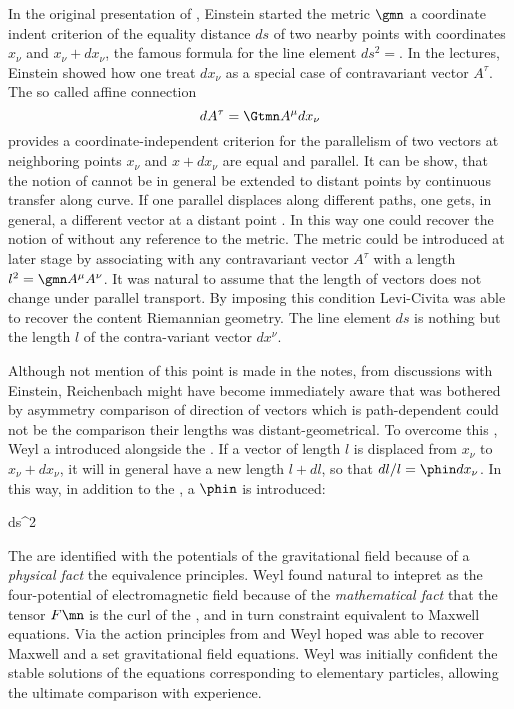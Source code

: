 {In the original presentation of \rt, Einstein started the metric $\gmn$ a coordinate indent criterion of the equality distance $ds$ of two nearby points  with coordinates $x_\nu$ and $x_\nu+dx_\nu$, the famous formula for the line element $ds^2=$. In the lectures, Einstein showed how one treat $dx_\nu$ as a special case of contravariant vector $A^\tau$. The so called affine connection $$dA^\tau = \Gtmn A^\mu dx_\nu$$ provides a coordinate-independent criterion for the parallelism of two vectors at neighboring points $x_\nu$ and $x+dx_\nu$ are equal and parallel. It can be show, that the notion of  cannot be in general be extended to distant points by continuous transfer along curve. If one parallel displaces along different paths, one gets, in general, a different vector at a distant point \citep[028-01-03, 37]{HR}. In this way one could recover the notion of  without any reference to the metric. The metric could be introduced at later stage by associating with any contravariant vector $A^\tau$ with a length $l^2=\gmn A^\mu A^\nu$. It was natural to assume that the length of vectors does not change under parallel transport. By imposing this condition Levi-Civita was able to recover the content Riemannian geometry. The line element $ds$ is nothing but the length $l$ of the contra-variant vector $dx^\nu$. 

Although not mention of this point is made in the notes, from discussions with Einstein, Reichenbach might have become immediately aware that \citep{Weyl1918a,Weyl1919a} was bothered by asymmetry comparison of direction of vectors which is path-dependent could not be the comparison their lengths was distant-geometrical. To overcome this , Weyl a introduced  alongside the . If a vector of length $l$ is displaced from $x_\nu$ to $x_\nu+dx_\nu$, it will in general have a new length $l+dl$, so that $dl/l=\phin dx_\nu$. In this way, in addition to the  \gmn, a  $\phin$ is introduced:

\begin{frame}{\secname}\setcounter{footnote}{0}
ds^2
\end{frame}

The \gmn are identified with the potentials of the gravitational field because of a \emph{physical fact} the equivalence principles. Weyl found natural to intepret \phin as the four-potential of electromagnetic field  because of the \emph{mathematical fact} that the tensor $F\mn$ is the curl of the \phin, and in turn constraint equivalent to Maxwell equations. Via the action principles from \gmn and \phin Weyl hoped was able to recover Maxwell and a set gravitational field equations. Weyl was initially confident  the stable solutions of the equations corresponding to elementary particles, allowing the ultimate comparison with experience.

}

